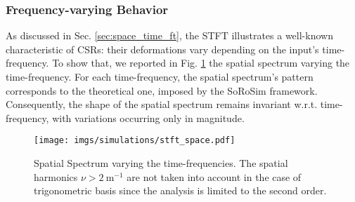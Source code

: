     \subsubsection{Frequency-varying Behavior}
    As discussed in Sec. \ref{sec:space_time_ft}, the \ac{STFT} illustrates a well-known characteristic of \acp{CSR}: their deformations vary depending on the input's time-frequency. To show that, we reported in Fig. \ref{fig:stft_space} the spatial spectrum varying the time-frequency. For each time-frequency, the spatial spectrum's pattern corresponds to the theoretical one, imposed by the \ac{SoRoSim} framework. Consequently, the shape of the spatial spectrum remains invariant w.r.t. time-frequency, with variations occurring only in magnitude.
    \begin{figure}
        \centering
        \texttt{[image: imgs/simulations/stft\_space.pdf]}
        \caption{Spatial Spectrum varying the time-frequencies.    
        The spatial harmonics $\nu > \SI{2}{\meter^{-1}}$ are not taken into account in the case of trigonometric basis since the analysis is limited to the second order.}
        \label{fig:stft_space}
    \end{figure}

